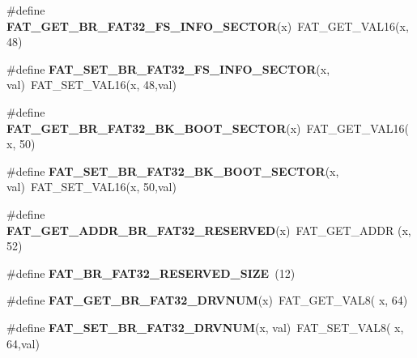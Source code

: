 \begin{DoxyCompactItemize}
\#define {\bfseries F\+A\+T\+\_\+\+G\+E\+T\+\_\+\+B\+R\+\_\+\+F\+A\+T32\+\_\+\+F\+S\+\_\+\+I\+N\+F\+O\+\_\+\+S\+E\+C\+T\+OR}(x)~F\+A\+T\+\_\+\+G\+E\+T\+\_\+\+V\+A\+L16(x, 48)
\item 
\mbox{\label{group__libfs__dosfs_gaca05a761c38009f6dad0411d82c50bdc}} 
\#define {\bfseries F\+A\+T\+\_\+\+S\+E\+T\+\_\+\+B\+R\+\_\+\+F\+A\+T32\+\_\+\+F\+S\+\_\+\+I\+N\+F\+O\+\_\+\+S\+E\+C\+T\+OR}(x,  val)~F\+A\+T\+\_\+\+S\+E\+T\+\_\+\+V\+A\+L16(x, 48,val)
\item 
\mbox{\label{group__libfs__dosfs_ga5b1fda79cb09d795ccd135477d042593}} 
\#define {\bfseries F\+A\+T\+\_\+\+G\+E\+T\+\_\+\+B\+R\+\_\+\+F\+A\+T32\+\_\+\+B\+K\+\_\+\+B\+O\+O\+T\+\_\+\+S\+E\+C\+T\+OR}(x)~F\+A\+T\+\_\+\+G\+E\+T\+\_\+\+V\+A\+L16(x, 50)
\item 
\mbox{\label{group__libfs__dosfs_ga0eed37919eca7310454f7f586d9ca9bf}} 
\#define {\bfseries F\+A\+T\+\_\+\+S\+E\+T\+\_\+\+B\+R\+\_\+\+F\+A\+T32\+\_\+\+B\+K\+\_\+\+B\+O\+O\+T\+\_\+\+S\+E\+C\+T\+OR}(x,  val)~F\+A\+T\+\_\+\+S\+E\+T\+\_\+\+V\+A\+L16(x, 50,val)
\item 
\mbox{\label{group__libfs__dosfs_gaa3bce14aad61e577fa08b88522e4fe19}} 
\#define {\bfseries F\+A\+T\+\_\+\+G\+E\+T\+\_\+\+A\+D\+D\+R\+\_\+\+B\+R\+\_\+\+F\+A\+T32\+\_\+\+R\+E\+S\+E\+R\+V\+ED}(x)~F\+A\+T\+\_\+\+G\+E\+T\+\_\+\+A\+D\+DR (x, 52)
\item 
\mbox{\label{group__libfs__dosfs_gac70d66a80e6e3fa729ef3755fcaa51e6}} 
\#define {\bfseries F\+A\+T\+\_\+\+B\+R\+\_\+\+F\+A\+T32\+\_\+\+R\+E\+S\+E\+R\+V\+E\+D\+\_\+\+S\+I\+ZE}~(12)
\item 
\mbox{\label{group__libfs__dosfs_ga739a28132d6439788f32c9a1b6c2e4eb}} 
\#define {\bfseries F\+A\+T\+\_\+\+G\+E\+T\+\_\+\+B\+R\+\_\+\+F\+A\+T32\+\_\+\+D\+R\+V\+N\+UM}(x)~F\+A\+T\+\_\+\+G\+E\+T\+\_\+\+V\+A\+L8( x, 64)
\item 
\mbox{\label{group__libfs__dosfs_ga84fc453b605811fe714f1b0051fe05bb}} 
\#define {\bfseries F\+A\+T\+\_\+\+S\+E\+T\+\_\+\+B\+R\+\_\+\+F\+A\+T32\+\_\+\+D\+R\+V\+N\+UM}(x,  val)~F\+A\+T\+\_\+\+S\+E\+T\+\_\+\+V\+A\+L8( x, 64,val)

\end{DoxyCompactItemize}
